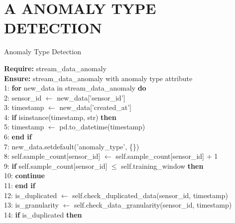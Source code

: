 \section*{A \quad ANOMALY TYPE DETECTION}

\begin{breakablealgorithm}[H]
\footnotesize
\caption{Anomaly Type Detection}
\begin{flushleft}
\textbf{Require:} stream\_data\_anomaly \\
\textbf{Ensure:} stream\_data\_anomaly with anomaly type attribute \\
1: \textbf{for} new\_data in stream\_data\_anomaly \textbf{do} \\
2: \hspace{0.5em} sensor\_id $\gets$ new\_data['sensor\_id'] \\
3: \hspace{0.5em} timestamp $\gets$ new\_data['created\_at'] \\
4: \hspace{0.5em} \textbf{if} isinstance(timestamp, str) \textbf{then} \\
5: \hspace{1em} timestamp $\gets$ pd.to\_datetime(timestamp) \\
6: \hspace{0.5em} \textbf{end if} \\
7: \hspace{0.5em} new\_data.setdefault('anomaly\_type', \{\}) \\
8: \hspace{0.5em} self.sample\_count[sensor\_id] $\gets$ self.sample\_count[sensor\_id] + 1 \\
9: \hspace{0.5em} \textbf{if} self.sample\_count[sensor\_id] $\leq$ self.training\_window \textbf{then} \\
10: \hspace{1em} \textbf{continue} \\
11: \hspace{0.5em} \textbf{end if} \\
12: \hspace{0.5em} is\_duplicated $\gets$ self.check\_duplicated\_data(sensor\_id, timestamp) \\
13: \hspace{0.5em} is\_granularity $\gets$ self.check\_data\_granularity(sensor\_id, timestamp) \\
14: \hspace{0.5em} \textbf{if} is\_duplicated \textbf{then} \\

\end{flushleft}
\end{breakablealgorithm}
